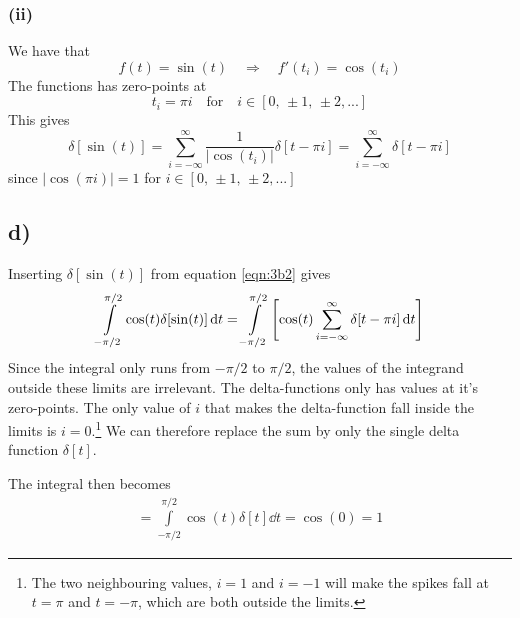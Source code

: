 \documentclass[10pt,a4paper]{article}
\begin{document}
\subsubsection*{(ii)}
We have that
\begin{equation}
    f(t) = \sin(t) \quad\Rightarrow\quad f'(t_i) = \cos(t_i)
\end{equation}
The functions has zero-points at
\begin{equation}
    t_i = \pi i \quad \text{for} \quad i \in [0,\, \pm 1,\, \pm 2, ...]
\end{equation}
This gives
\begin{equation}\label{eqn:3b2}
    \delta[\sin(t)] = \sum_{i=-\infty}^{\infty} \frac{1}{|\cos(t_i)|} \delta[t-\pi i] = \sum_{i=-\infty}^{\infty} \delta[t-\pi i]
\end{equation}
since $|\cos(\pi i)| = 1$ for $i\in [0,\, \pm 1,\, \pm 2, ...]$


\subsection*{d)}
Inserting $\delta[\sin(t)]$ from equation \ref{eqn:3b2} gives
\begin{align}
    \int\limits_{-\pi/2}^{\pi/2} \cos(t)\delta[\sin(t)]\dd{t} = \int\limits_{-\pi/2}^{\pi/2}\qty[ \cos(t)\sum_{i=-\infty}^{\infty} \delta[t-\pi i] \dd{t} ]
\end{align}
Since the integral only runs from $-\pi/2$ to $\pi/2$, the values of the integrand outside these limits are irrelevant. The delta-functions only has values at it's zero-points. The only value of $i$ that makes the delta-function fall inside the limits is $i=0$.\footnote{The two neighbouring values, $i=1$ and $i=-1$ will make the spikes fall at $t=\pi$ and $t=-\pi$, which are both outside the limits.} We can therefore replace the sum by only the single delta function $\delta[t]$.

The integral then becomes
\begin{align}
    = \int\limits_{-\pi/2}^{\pi/2} \cos(t) \delta[t] \dd{t} = \cos(0) = 1
\end{align}
\end{document}
